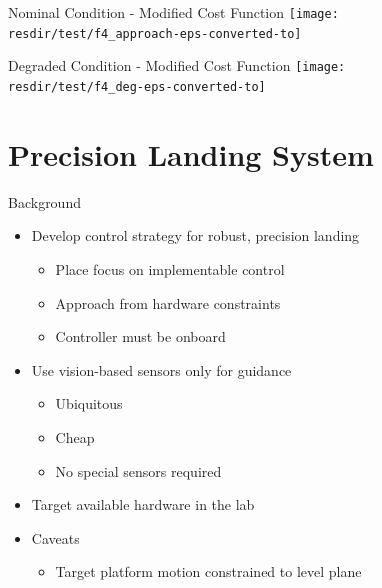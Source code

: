\documentclass[]{beamer}
\newcommand{\resdir}{../results}
\begin{document}
\begin{frame}{Nominal Condition - Modified Cost Function}
    \centering
    \vspace{1cm}
    \texttt{[image: \\resdir/test/f4\_approach-eps-converted-to]}
\end{frame}

\begin{frame}{Degraded Condition - Modified Cost Function}
    \centering
    \vspace{1cm}
    \texttt{[image: \\resdir/test/f4\_deg-eps-converted-to]}
\end{frame}

\section{Precision Landing System}
\begin{frame}{Background}
    \begin{itemize}
        \item Develop control strategy for robust, precision landing
            \begin{itemize}
                \item Place focus on implementable control
                \item Approach from hardware constraints
                \item Controller must be onboard
            \end{itemize}
        \item Use vision-based sensors only for guidance
            \begin{itemize}
                \item Ubiquitous
                \item Cheap
                \item No special sensors required
            \end{itemize}
        \item Target available hardware in the lab
        \item Caveats
            \begin{itemize}
                \item Target platform motion constrained to level plane
            \end{itemize}
    \end{itemize}
\end{frame}
\end{document}
